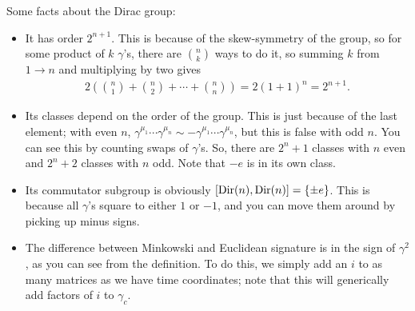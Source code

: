 \documentclass[11pt]{article}
\begin{document}

\noin
Some facts about the Dirac group:
\begin{itemize}
    \item It has order $2^{n + 1}$. This is because of the skew-symmetry of the group,
    so for some product of $k$ $\gamma$'s, there are ${n \choose k}$ ways to do it,
    so summing $k$ from $1 \to n$ and multiplying by two gives
    \begin{align*}
        2\left( {n \choose 1} + {n \choose 2} + \cdots + {n \choose n} \right) = 2 (1 + 1)^n = 2^{n + 1}.
    \end{align*}
    \item Its classes depend on the order of the group. This is just because of the last
    element; with even $n$, $\gamma^{\mu_1} \cdots \gamma^{\mu_n} \sim - \gamma^{\mu_1} \cdots \gamma^{\mu_n}$,
    but this is false with odd $n$. You can see this by counting swaps of $\gamma$'s.
    So, there are $2^n + 1$ classes with $n$ even and $2^n + 2$ classes with $n$ odd.
    Note that $-e$ is in its own class.
    \item Its commutator subgroup is obviously $[{\rm Dir}(n), {\rm Dir}(n)] = \{ \pm e \}$.
    This is because all $\gamma$'s square to either $1$ or $-1$, and you can move them
    around by picking up minus signs.
    \item The difference between Minkowski and Euclidean signature is in the sign
    of $\gamma^2$, as you can see from the definition. To do this, we simply
    add an $i$ to as many matrices as we have time coordinates; note that this will
    generically add factors of $i$ to $\gamma_c$.
\end{itemize}
\end{document}
